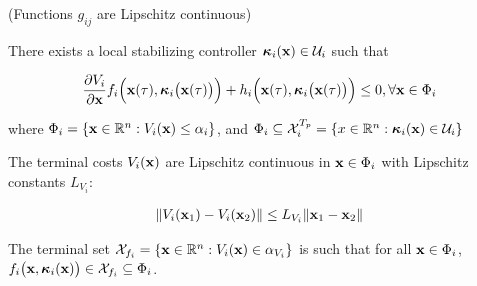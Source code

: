 \begin{gg_box}
\begin{assumption} (Functions $g_{ij}$ are Lipschitz continuous)
  \label{ass:g_ij_Lipschitz}
\end{assumption}
\end{gg_box}

\begin{gg_box}
\begin{assumption}

  There exists a local stabilizing controller
  $\bm{\mathbf{\kappa}}_i(\bm{\mathbf{x}}) \in \mathcal{U}_i$ such that

  \begin{align}
    \dfrac{\partial V_i}{\partial \bm{\mathbf{x}}} f_i \Big(\bm{\mathbf{x}}(\tau), \bm{\mathbf{\kappa}}_i\big(\bm{\mathbf{x}}(\tau)\big)\Big) +
      h_i\Big(\bm{\mathbf{x}}(\tau), \bm{\mathbf{\kappa}}_i \big(\bm{\mathbf{x}}(\tau)\big)\Big) \leq 0, \forall \bm{\mathbf{x}} \in \Phi_i
  \end{align}

  where $\Phi_i = \{\bm{\mathbf{x}} \in \mathbb{R}^n : V_i(\bm{\mathbf{x}}) \leq \alpha_i \}$, and
  $\Phi_i \subseteq \mathcal{X}_i^{T_p} = \{x \in \mathbb{R}^n : \bm{\mathbf{\kappa}}_i(\bm{\mathbf{x}}) \in \mathcal{U}_i\}$

  \label{ass:local_controller_k}
\end{assumption}
\end{gg_box}


\begin{gg_box}
\begin{assumption}

  The terminal costs $V_i(\bm{\mathbf{x}})$ are Lipschitz continuous in $\bm{\mathbf{x}} \in \Phi_i$
  with Lipschitz constants $L_{V_i}$:

  \begin{align}
    \| V_i(\bm{\mathbf{x}}_1) - V_i(\bm{\mathbf{x}}_2)\| \leq L_{V_i} \|\bm{\mathbf{x}}_1 - \bm{\mathbf{x}}_2 \|
  \end{align}

  \label{ass:V_i_Lipschitz}
\end{assumption}
\end{gg_box}


\begin{gg_box}
\begin{assumption}

  The terminal set $\mathcal{X}_{f_i} = \{ \bm{\mathbf{x}} \in \mathbb{R}^n : V_i(\bm{\mathbf{x}}) \in \alpha_{V_i}\}$
  is such that for all $\bm{\mathbf{x}} \in \Phi_i$, $f_i\big(\bm{\mathbf{x}}, \bm{\mathbf{\kappa}}_i(\bm{\mathbf{x}})\big) \in \mathcal{X}_{f_i} \subseteq \Phi_i$.

  \label{ass:x_f_i}
\end{assumption}
\end{gg_box}
